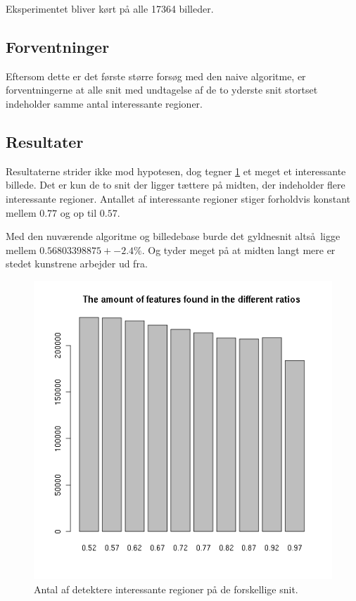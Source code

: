 {Eksperimentet bliver kørt på alle 17364 billeder.
\newpage
\subsection{Forventninger}
Eftersom dette er det første større forsøg med den naive algoritme, er
forventningerne at alle snit med undtagelse af de to yderste snit
stortset indeholder samme antal interessante regioner.

\subsection{Resultater}
Resultaterne strider ikke mod hypotesen, dog tegner \ref{diffratios}
et meget et interessante billede. Det er kun de to snit der ligger
tættere på midten, der indeholder flere interessante regioner.
Antallet af interessante regioner stiger forholdvis konstant mellem
$0.77$ og op til $0.57$.

Med den nuværende algoritme og billedebase burde det gyldnesnit
altså ligge mellem $0.56803398875 +- 2.4\%$.
Og tyder meget på at midten langt mere er stedet kunstrene arbejder
ud fra.
\begin{figure}[h!]
	\begin{center}
		\includegraphics[scale=0.5]{afsnit/resultater/billeder/featsperratio.png}
	\end{center}
	\caption{Antal af detektere interessante regioner på de forskellige snit.}
	\label{diffratios}
\end{figure}




}

